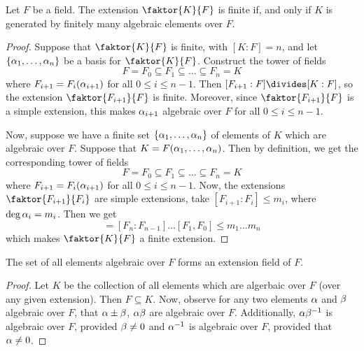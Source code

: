 \begin{theorem}\label{theorem_8.2.7}
  Let $F$ be a field. The extension $\faktor{K}{F}$ is finite if, and
  only if $K$ is generated by finitely many algebraic elements over
  $F$.
\end{theorem}
\begin{proof}
  Suppose that $\faktor{K}{F}$ is finite, with $[K:F]=n$, and let $\{
  \alpha_1, \dots, \alpha_n \}$ be a basis for $\faktor{K}{F}$. Construct the
  tower of fields
  \begin{equation*}
    F=F_0 \subseteq F_1 \subseteq \dots \subseteq F_n=K
  \end{equation*}
  where $F_{i+1}=F_i(\alpha_{i+1})$ for all $0 \leq i \leq n-1$. Then
  $[F_{i+1}:F] \divides [K:F]$, so the extension $\faktor{F_{i+1}}{F}$ is
  finite. Moreover, since $\faktor{F_{i+1}}{F}$ is a simple extension,
  this makes $\alpha_{i+1}$ algebraic over $F$ for all $0 \leq i \leq
  n-1$.

  Now, suppose we have a finite set $\{\alpha_1, \dots, \alpha_n\}$ of
  elements of $K$ which are algebraic over $F$. Suppose that
  $K=F(\alpha_1, \dots, \alpha_n)$. Then by definition, we get the
  corresponding tower of fields
  \begin{equation*}
    F=F_0 \subseteq F_1 \subseteq \dots \subseteq F_n=K
  \end{equation*}
  where $F_{i+1}=F_i(\alpha_{i+1})$ for all $0 \leq i \leq n-1$. Now, the
  extensions $\faktor{F_{i+1}}{F_i}$ are simple extensions, take
  $[F_{i+1}:F_i] \leq m_i$, where $\deg{\alpha_i}=m_i$. Then we get
  \begin{equation*}
    [K:F]=[F_n:F_{n-1}]\dots[F_1,F_0]\leq m_1 \dots m_n
  \end{equation*}
  which makes $\faktor{K}{F}$ a finite extension.
\end{proof}
\begin{corollary}
  The set of all elements algebraic over $F$ forms an extension field
  of $F$.
\end{corollary}
\begin{proof}
  Let $K$ be the collection of all elements which are algerbaic over
  $F$ (over any given extension). Then $F \subseteq K$. Now, observe
  for any two elements $\alpha$ and $\beta$ algebraic over $F$, that $\alpha \pm
  \beta$, $\alpha\beta$ are algebraic over $F$. Additionally, $\alpha\beta^{-1}$ is
  algebraic over $F$, provided  $\beta \neq 0$ and $\alpha^{-1}$ is
  algebraic over $F$, provided that $\alpha \neq 0$.
\end{proof}

